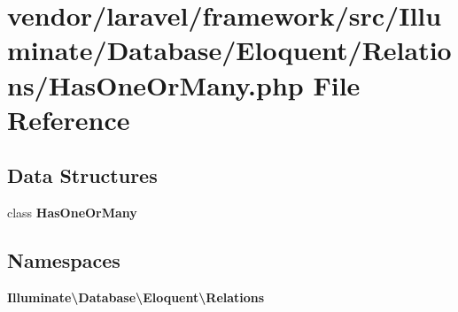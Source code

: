 \section{vendor/laravel/framework/src/\+Illuminate/\+Database/\+Eloquent/\+Relations/\+Has\+One\+Or\+Many.php File Reference}
\label{_has_one_or_many_8php}
\subsection*{Data Structures}
\begin{DoxyCompactItemize}
\item 
class {\bf Has\+One\+Or\+Many}
\end{DoxyCompactItemize}
\subsection*{Namespaces}
\begin{DoxyCompactItemize}
\item 
 {\bf Illuminate\textbackslash{}\+Database\textbackslash{}\+Eloquent\textbackslash{}\+Relations}
\end{DoxyCompactItemize}
